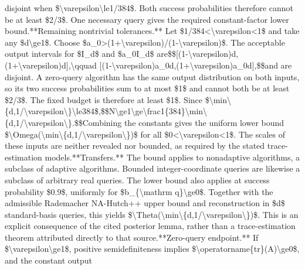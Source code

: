\documentclass[10pt,a4paper]{article}
\begin{document}
disjoint when \$\textbackslash{}varepsilon\textbackslash{}le1/\allowbreak{}384\$. Both success probabilities therefore cannot be at least \$2/\allowbreak{}3\$. One necessary query gives the required constant-factor lower bound.\newline{}\newline{}**Remaining nontrivial tolerances.** Let \$1/\allowbreak{}384<\textbackslash{}varepsilon<1\$ and take any \$d\textbackslash{}ge1\$. Choose \$a\_\allowbreak{}0>(1+\textbackslash{}varepsilon)/\allowbreak{}(1-\textbackslash{}varepsilon)\$. The acceptable output intervals for \$I\_\allowbreak{}d\$ and \$a\_\allowbreak{}0I\_\allowbreak{}d\$ are\newline{}\$\$[(1-\textbackslash{}varepsilon)d,\allowbreak{}(1+\textbackslash{}varepsilon)d],\allowbreak{}\textbackslash{}qquad [(1-\textbackslash{}varepsilon)a\_\allowbreak{}0d,\allowbreak{}(1+\textbackslash{}varepsilon)a\_\allowbreak{}0d],\allowbreak{}\$\$\newline{}and are disjoint. A zero-query algorithm has the same output distribution on both inputs,\allowbreak{} so its two success probabilities sum to at most \$1\$ and cannot both be at least \$2/\allowbreak{}3\$. The fixed budget is therefore at least \$1\$. Since \$\textbackslash{}min\textbackslash{}\{d,\allowbreak{}1/\allowbreak{}\textbackslash{}varepsilon\textbackslash{}\}\textbackslash{}le384\$,\allowbreak{}\newline{}\$\$N\textbackslash{}ge1\textbackslash{}ge\textbackslash{}frac1\{384\}\textbackslash{}min\textbackslash{}\{d,\allowbreak{}1/\allowbreak{}\textbackslash{}varepsilon\textbackslash{}\}.\$\$\newline{}Combining the constants gives the uniform lower bound \$\textbackslash{}Omega(\textbackslash{}min\textbackslash{}\{d,\allowbreak{}1/\allowbreak{}\textbackslash{}varepsilon\textbackslash{}\})\$ for all \$0<\textbackslash{}varepsilon<1\$. The scales of these inputs are neither revealed nor bounded,\allowbreak{} as required by the stated trace-estimation models.\newline{}\newline{}**Transfers.** The bound applies to nonadaptive algorithms,\allowbreak{} a subclass of adaptive algorithms. Bounded integer-coordinate queries are likewise a subclass of arbitrary real queries. The lower bound also applies at success probability \$0.9\$,\allowbreak{} uniformly for \$b\_\allowbreak{}\{\textbackslash{}mathrm q\}\textbackslash{}ge0\$. Together with the admissible Rademacher NA-Hutch++ upper bound and reconstruction in \$d\$ standard-basis queries,\allowbreak{} this yields \$\textbackslash{}Theta(\textbackslash{}min\textbackslash{}\{d,\allowbreak{}1/\allowbreak{}\textbackslash{}varepsilon\textbackslash{}\})\$. This is an explicit consequence of the cited posterior lemma,\allowbreak{} rather than a trace-estimation theorem attributed directly to that source.\newline{}\newline{}**Zero-query endpoint.** If \$\textbackslash{}varepsilon\textbackslash{}ge1\$,\allowbreak{} positive semidefiniteness implies \$\textbackslash{}operatorname\{tr\}(A)\textbackslash{}ge0\$,\allowbreak{} and the constant output 
\end{document}
